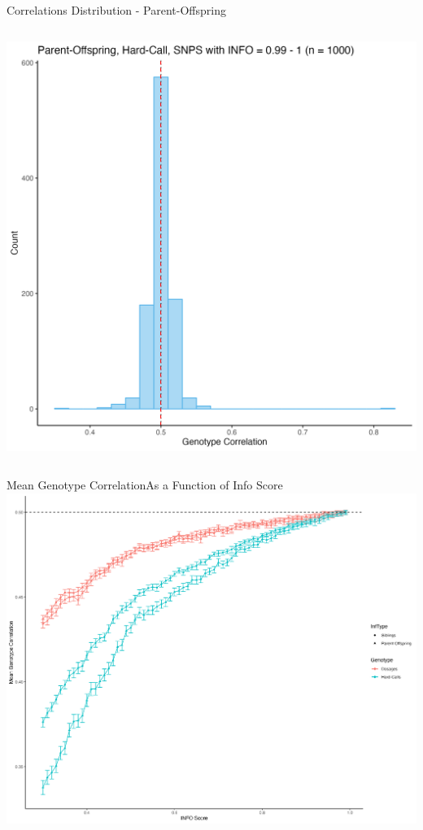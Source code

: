 \documentclass{beamer}
\begin{document}
\begin{frame}{Correlations Distribution - Parent-Offspring}
\begin{columns}
\begin{column}{0.5\textwidth}
                \includegraphics[width= \textwidth]{fig/PO-HC-i99.png}
            \end{column}
        \end{columns}
\end{frame}

\begin{frame}{Mean Genotype Correlation}{As a Function of Info Score}
      \centering
      \includegraphics[width=.80\textwidth]{fig/mean_gt_corr_v2.png}
\end{frame}
\end{document}
